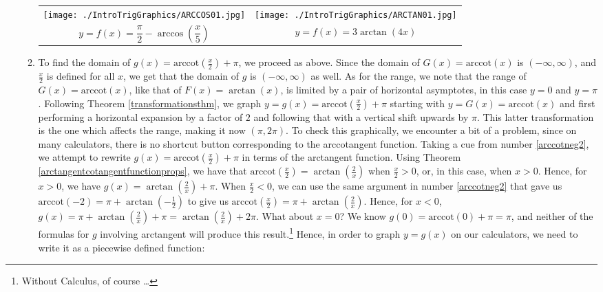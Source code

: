 \begin{ex}
\begin{enumerate}
\begin{enumerate}
\smallskip

\begin{tabular}{cc}

\texttt{[image: ./IntroTrigGraphics/ARCCOS01.jpg]} &
\hspace{0.75in} \texttt{[image: ./IntroTrigGraphics/ARCTAN01.jpg]}  \\

$y =f(x) = \dfrac{\pi}{2} - \arccos\left(\dfrac{x}{5}\right)$ & \hspace{0.75in} $y = f(x) = 3\arctan\left(4x \right)$
\end{tabular} 

\item  To find the domain of $g(x) = \text{arccot}\left(\frac{x}{2}\right) + \pi$, we proceed as above.  Since the domain of $G(x) = \text{arccot}(x)$ is $(-\infty, \infty)$, and $\frac{x}{2}$ is defined for all $x$, we get that the domain of $g$ is $(-\infty, \infty)$ as well.  As for the range, we note that the range of $G(x)  = \text{arccot}(x)$, like that of $F(x) = \arctan(x)$, is limited by a pair of horizontal asymptotes, in this case $y = 0$ and $y = \pi$.  Following  Theorem \ref{transformationsthm}, we graph $y =  g(x) = \text{arccot}\left(\frac{x}{2}\right) + \pi$ starting with $y = G(x) = \text{arccot}(x)$ and first performing a horizontal expansion by a factor of $2$ and following that with a vertical shift upwards by $\pi$.  This latter transformation is the one which affects the range, making it now $(\pi, 2\pi)$.  To check this graphically, we encounter a bit of a problem, since on many calculators, there is no shortcut button corresponding to the arccotangent function. Taking a cue from number \ref{arccotneg2}, we attempt to rewrite $g(x) = \text{arccot}\left(\frac{x}{2}\right) + \pi$ in terms of the arctangent function. Using Theorem \ref{arctangentcotangentfunctionprops}, we have that $\text{arccot}\left(\frac{x}{2}\right) = \arctan\left(\frac{2}{x}\right)$ when $\frac{x}{2} > 0$, or, in this case, when $x > 0$.  Hence, for $x > 0$, we have $g(x) = \arctan\left(\frac{2}{x}\right) + \pi$.  When $\frac{x}{2} < 0$, we can use the same argument in number \ref{arccotneg2} that gave us $\text{arccot}(-2) = \pi + \arctan\left(-\frac{1}{2}\right)$ to give us $\text{arccot}\left(\frac{x}{2}\right) = \pi + \arctan\left(\frac{2}{x}\right)$.  Hence, for $x < 0$, $g(x) = \pi + \arctan\left(\frac{2}{x}\right) + \pi = \arctan\left(\frac{2}{x}\right) + 2\pi$.  What about $x=0$?  We know $g(0) = \text{arccot}(0) + \pi = \pi$, and neither of the formulas for $g$ involving arctangent will produce this result.\footnote{Without Calculus, of course \ldots}  Hence, in order to graph $y = g(x)$ on our calculators, we need to write it as a piecewise defined function:


\end{enumerate}
\end{enumerate}
\end{ex}
